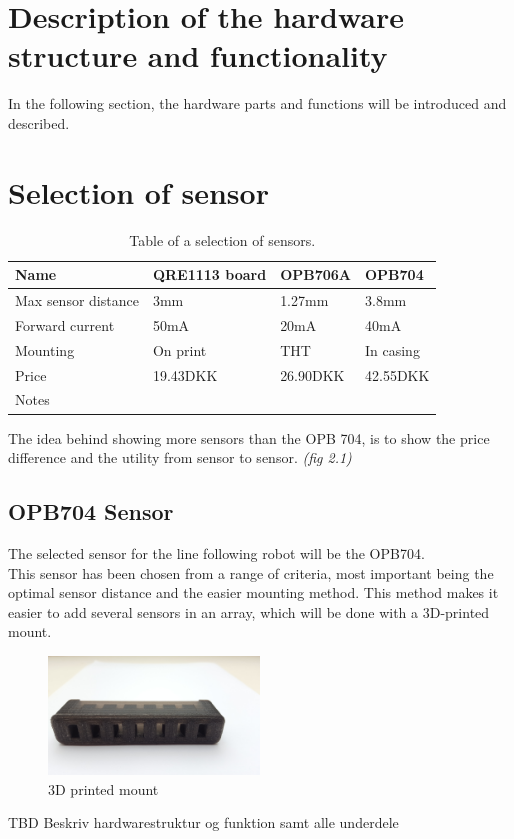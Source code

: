 \section{Description of the hardware structure and functionality}
In the following section, the hardware parts and functions will be introduced and described.
\section{Selection of sensor}

\begin{table}[htbp]
    \begin{tabular}{|l|l|l|l|}
        \hline
        Name                & QRE1113 board & OPB706A  & OPB704    \\ \hline
        Max sensor distance & 3mm                            & 1.27mm   & 3.8mm     \\ \hline
        Forward current     & 50mA                           & 20mA     & 40mA      \\ \hline
        Mounting            & On print                       & THT      & In casing \\ \hline
        Price               & 19.43DKK                       & 26.90DKK & 42.55DKK  \\ \hline
        Notes               & ~                              & ~        & ~         \\
        \hline
    \end{tabular}
    \caption{Table of a selection of sensors.}
\label{sensor_table}
\end{table}
The idea behind showing more sensors than the OPB 704, is to show the price difference and the utility from sensor to sensor. \emph{(fig 2.1)}



\subsection{OPB704 Sensor}
The selected sensor for the line following robot will be the OPB704.\\
This sensor has been chosen from a range of criteria, most important being the optimal sensor distance and the easier mounting method. This method makes it easier to add several sensors in an array, which will be done with a 3D-printed mount. 

\begin{figure}[h!]
  \centering
  \includegraphics[width=0.5\textwidth]{figures/sensorarray.jpg}
  
  \caption{3D printed mount}
  \label{3D mount}
\end{figure}
TBD Beskriv hardwarestruktur og funktion samt alle underdele


